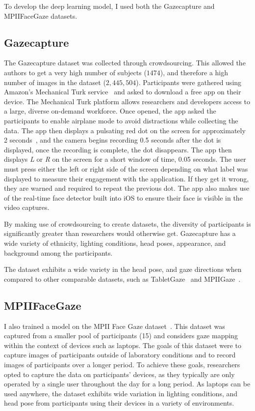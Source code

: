 \documentclass{report}
\begin{document}
To develop the deep learning model, I used both the Gazecapture and MPIIFaceGaze datasets. 

\subsection{Gazecapture}\label{sec:gazecapture}

The Gazecapture dataset was collected through crowdsourcing. This allowed the authors to get a very high number of subjects ($1474$), and therefore a high number of images in the dataset ($2,445,504$). Participants were gathered using Amazon's Mechanical Turk service~\cite{mturk} and asked to download a free app on their device. The Mechanical Turk platform allows researchers and developers access to a large, diverse on-demand workforce. Once opened, the app asked the participants to enable airplane mode to avoid distractions while collecting the data. The app then displays a pulsating red dot on the screen for approximately 2 seconds~\cite{krafka2016eye}, and the camera begins recording 0.5 seconds after the dot is displayed, once the recording is complete, the dot disappears. The app then displays \textit{L} or \textit{R} on the screen for a short window of time, 0.05 seconds. The user must press either the left or right side of the screen depending on what label was displayed to measure their engagement with the application. If they get it wrong, they are warned and required to repeat the previous dot. The app also makes use of the real-time face detector built into iOS to ensure their face is visible in the video captures.

By making use of crowdsourcing to create datasets, the diversity of participants is significantly greater than researchers would otherwise get. Gazecapture has a wide variety of ethnicity, lighting conditions, head poses, appearance, and background among the participants.


The dataset exhibits a wide variety in the head pose, and gaze directions when compared to other comparable datasets, such as TabletGaze~\cite{huang2016tabletgaze} and MPIIGaze~\cite{zhang15cvpr}.


\subsection{MPIIFaceGaze}

I also trained a model on the MPII Face Gaze dataset~\cite{zhang2019mpii}. This dataset was captured from a smaller pool of participants (15) and considers gaze mapping within the context of devices such as laptops. The goals of this dataset were to capture images of participants outside of laboratory conditions and to record images of participants over a longer period. To achieve these goals, researchers opted to capture the data on participants' devices, as they typically are only operated by a single user throughout the day for a long period. As laptops can be used anywhere, the dataset exhibits wide variation in lighting conditions, and head pose from participants using their devices in a variety of environments. 
\end{document}
